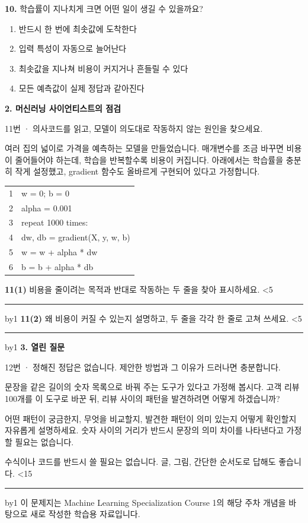 \documentclass[11pt,a4paper]{article}
\newcommand{\parttitle}[2]{{\large\bfseries\color{ink} #1}\par{\small #2}\par\vspace{5mm}}
\newcommand{\question}[2]{\textbf{#1.} #2\par}
\newcommand{\answerlines}[1]{\foreachline{#1}}
\newcommand{\foreachline}[1]{\linecount=0\loop\ifnum\linecount<#1\vspace{8mm}\par{\color{rulegray}\hrule}\advance\linecount by1\repeat}
\begin{document}
\question{10}{학습률이 지나치게 크면 어떤 일이 생길 수 있을까요?}
\begin{enumerate}[label=(\arabic*),leftmargin=9mm,itemsep=0pt,topsep=2pt,parsep=0pt]
\item 반드시 한 번에 최솟값에 도착한다
\item 입력 특성이 자동으로 늘어난다
\item 최솟값을 지나쳐 비용이 커지거나 흔들릴 수 있다
\item 모든 예측값이 실제 정답과 같아진다
\end{enumerate}\vfill
\newpage
\parttitle{2. 머신러닝 사이언티스트의 점검}{11번 · 의사코드를 읽고, 모델이 의도대로 작동하지 않는 원인을 찾으세요.}
여러 집의 넓이로 가격을 예측하는 모델을 만들었습니다. 매개변수를 조금 바꾸면 비용이 줄어들어야 하는데, 학습을 반복할수록 비용이 커집니다. 아래에서는 학습률을 충분히 작게 설정했고, gradient 함수도 올바르게 구현되어 있다고 가정합니다.
\par\vspace{3mm}
{\small\ttfamily\begin{tabular}{r l}
1 & \hspace*{0.0mm}w = 0; b = 0 \\
2 & \hspace*{0.0mm}alpha = 0.001 \\
3 & \hspace*{0.0mm}repeat 1000 times: \\
4 & \hspace*{6.0mm}dw, db = gradient(X, y, w, b) \\
5 & \hspace*{6.0mm}w = w + alpha * dw \\
6 & \hspace*{6.0mm}b = b + alpha * db \\
\end{tabular}}\par\vspace{5mm}
\textbf{11(1)} 비용을 줄이려는 목적과 반대로 작동하는 두 줄을 찾아 표시하세요.
\answerlines{5}
\vspace{6mm}
\textbf{11(2)} 왜 비용이 커질 수 있는지 설명하고, 두 줄을 각각 한 줄로 고쳐 쓰세요.
\answerlines{5}
\vspace{6mm}
\newpage
\parttitle{3. 열린 질문}{12번 · 정해진 정답은 없습니다. 제안한 방법과 그 이유가 드러나면 충분합니다.}
문장을 같은 길이의 숫자 목록으로 바꿔 주는 도구가 있다고 가정해 봅시다. 고객 리뷰 100개를 이 도구로 바꾼 뒤, 리뷰 사이의 패턴을 발견하려면 어떻게 하겠습니까?
\par\vspace{3mm}
어떤 패턴이 궁금한지, 무엇을 비교할지, 발견한 패턴이 의미 있는지 어떻게 확인할지 자유롭게 설명하세요. 숫자 사이의 거리가 반드시 문장의 의미 차이를 나타낸다고 가정할 필요는 없습니다.
\par\vspace{3mm}
{\small 수식이나 코드를 반드시 쓸 필요는 없습니다. 글, 그림, 간단한 순서도로 답해도 좋습니다.}
\answerlines{15}
\vfill{\footnotesize 이 문제지는 Machine Learning Specialization Course 1의 해당 주차 개념을 바탕으로 새로 작성한 학습용 자료입니다.}
\end{document}

